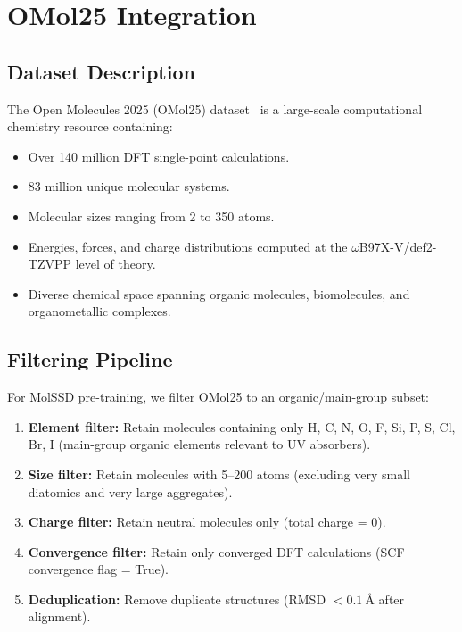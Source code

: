\documentclass[12pt,a4paper]{article}
\begin{document}
\section{OMol25 Integration}\label{sec:omol25}

\subsection{Dataset Description}

The Open Molecules 2025 (OMol25) dataset~\cite{omol25} is a large-scale computational chemistry resource containing:
\begin{itemize}
    \item Over 140 million DFT single-point calculations.
    \item 83 million unique molecular systems.
    \item Molecular sizes ranging from 2 to 350 atoms.
    \item Energies, forces, and charge distributions computed at the $\omega$B97X-V/def2-TZVPP level of theory.
    \item Diverse chemical space spanning organic molecules, biomolecules, and organometallic complexes.
\end{itemize}

\subsection{Filtering Pipeline}

For MolSSD pre-training, we filter OMol25 to an organic/main-group subset:

\begin{enumerate}
    \item \textbf{Element filter:} Retain molecules containing only H, C, N, O, F, Si, P, S, Cl, Br, I (main-group organic elements relevant to UV absorbers).
    \item \textbf{Size filter:} Retain molecules with 5--200 atoms (excluding very small diatomics and very large aggregates).
    \item \textbf{Charge filter:} Retain neutral molecules only (total charge = 0).
    \item \textbf{Convergence filter:} Retain only converged DFT calculations (SCF convergence flag = True).
    \item \textbf{Deduplication:} Remove duplicate structures (RMSD $< \SI{0.1}{\angstrom}$ after alignment).
\end{enumerate}
\end{document}
